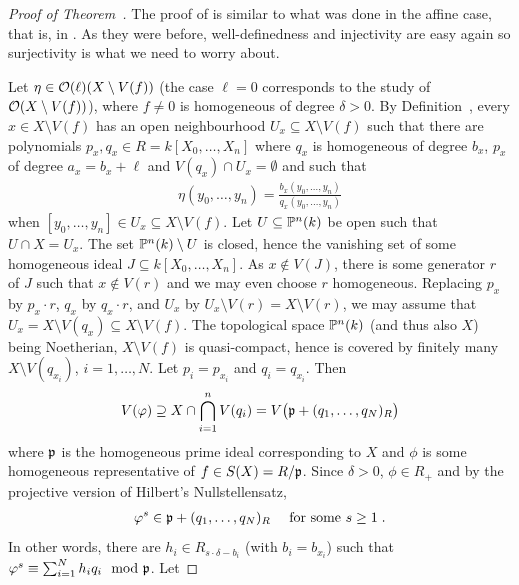 \documentclass[a4paper,parskip=half,numbers=enddot, DIV=12]{scrreprt}
\begin{document}
\begin{proof}[Proof of Theorem~]
    The proof of  is similar to what was done in the affine case, that is, in \cite[Proposition~2.2.2]{alg1}. As they were before, well-definedness and injectivity are easy again so surjectivity is what we need to worry about. 
    
    Let $\eta\in \mathcal{O}(\ell)(X\setminus V(f))$ (the case $\ell=0$ corresponds to the study of $\mathcal{O}(X\setminus V(f))$), where $f\neq 0$ is homogeneous of degree $\delta >0$. By Definition~, every $x\in X\setminus V(f)$ has an open neighbourhood $U_x\subseteq X\setminus V(f)$ such that there are polynomials $p_x,q_x\in R=k[X_0,\ldots, X_n]$ where $q_x$ is homogeneous of degree $b_x$, $p_x$ of degree $a_x = b_x+\ell$ and $V(q_x)\cap U_x = \emptyset$ and such that 
    \begin{align*}
        \eta(y_0,\ldots, y_n) = \frac{b_x(y_0,\ldots, y_n)}{q_x(y_0,\ldots, y_n)}
    \end{align*}
    when $[y_0,\ldots, y_n]\in U_x\subseteq X\setminus V(f)$. Let $U\subseteq \mathbb{P}^n(k)$ be open such that $U\cap X=U_x$. The set $\mathbb{P}^n(k)\setminus U$ is closed, hence the vanishing set of some homogeneous ideal $J\subseteq k[X_0,\ldots,X_n]$. As $x\notin V(J)$, there is some generator $r$ of $J$ such that $x\notin V(r)$ and we may even choose $r$ homogeneous. Replacing $p_x$ by $p_x\cdot r$, $q_x$ by $q_x\cdot r$, and $U_x$ by $U_x\setminus V(r) = X\setminus V(r)$, we may assume that $U_x= X\setminus V(q_x)\subseteq X\setminus V(f)$. The topological space $\mathbb{P}^n(k)$ (and thus also $X$) being Noetherian, $X\setminus V(f)$ is quasi-compact, hence is covered by finitely many $X\setminus V(q_{x_i})$, $i=1,\ldots,N$. Let $p_i= p_{x_i}$ and $q_i = q_{x_i}$. Then 
    \begin{align*}
        V(\varphi) \supseteq X\cap \bigcap_{i=1}^n V(q_i) = V\big(\mathfrak{p}+ (q_1,\ldots, q_N)_R\big)
    \end{align*}
    where $\mathfrak{p}$ is the homogeneous prime ideal corresponding to $X$ and $\phi$ is some homogeneous representative of $f\in S(X) = R/\mathfrak{p}$. Since $\delta >0$, $\phi\in R_+$ and by the projective version of Hilbert's Nullstellensatz, 
    \begin{align*}
        \varphi^s \in  \mathfrak{p}+(q_1,\ldots,q_N)_R\quad\text{ for some }s\geq 1\;.
    \end{align*}
    In other words, there are $h_i\in R_{s\cdot \delta-b_i}$ (with $b_i=b_{x_i}$) such that $\varphi^s\equiv \sum_{i=1}^N h_iq_i \mod{\mathfrak{p}}$. Let 

\end{proof}
\end{document}
